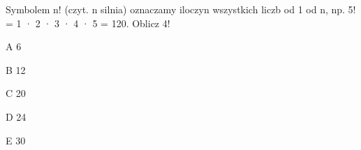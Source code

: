 \begin{tresc}
Symbolem n! (czyt. n silnia) oznaczamy iloczyn wszystkich liczb od 1 od n, np. 5! = 1 · 2 · 3 · 4 · 5 = 120. Oblicz 4!
\end{tresc}
\begin{wariant}{A} 6 \end{wariant}
\begin{wariant}{B} 12 \end{wariant}
\begin{wariant}{C} 20 \end{wariant}
\begin{wariant}{D} 24 \end{wariant}
\begin{wariant}{E} 30 \end{wariant}
